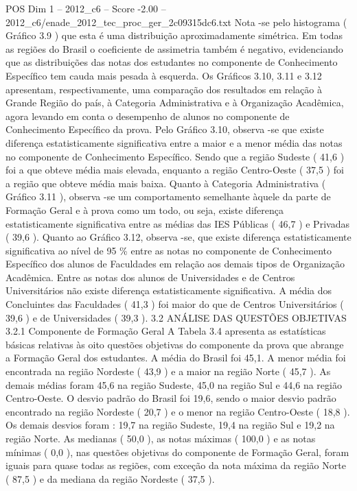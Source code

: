 \begin{textsample}{POS Dim 1 – 2012\_c6 – Score -2.00 – 2012\_c6/enade\_2012\_tec\_proc\_ger\_2c09315dc6.txt}
Nota -se pelo histograma ( Gráfico 3.9 ) que esta é uma distribuição aproximadamente simétrica.
Em todas as regiões do Brasil o coeficiente de assimetria também é negativo, evidenciando que as distribuições das notas dos estudantes no componente de Conhecimento Específico tem cauda mais pesada à esquerda.
Os Gráficos 3.10, 3.11 e 3.12 apresentam, respectivamente, uma comparação dos resultados em relação à Grande Região do país, à Categoria Administrativa e à Organização Acadêmica, agora levando em conta o desempenho de alunos no componente de Conhecimento Específico da prova.
Pelo Gráfico 3.10, observa -se que existe diferença estatisticamente significativa entre a maior e a menor média das notas no componente de Conhecimento Específico.
Sendo que a região Sudeste ( 41,6 ) foi a que obteve média mais elevada, enquanto a região Centro-Oeste ( 37,5 ) foi a região que obteve média mais baixa.
Quanto à Categoria Administrativa ( Gráfico 3.11 ), observa -se um comportamento semelhante àquele da parte de Formação Geral e à prova como um todo, ou seja, existe diferença estatisticamente significativa entre as médias das IES Públicas ( 46,7 ) e Privadas ( 39,6 ).
Quanto ao Gráfico 3.12, observa -se, que existe diferença estatisticamente significativa ao nível de 95 \% entre as notas no componente de Conhecimento Específico dos alunos de Faculdades em relação aos demais tipos de Organização Acadêmica.
Entre as notas dos alunos de Universidades e de Centros Universitários não existe diferença estatisticamente significativa.
A média dos Concluintes das Faculdades ( 41,3 ) foi maior do que de Centros Universitários ( 39,6 ) e de Universidades ( 39,3 ). 3.2 ANÁLISE DAS QUESTÕES OBJETIVAS 3.2.1 Componente de Formação Geral A Tabela 3.4 apresenta as estatísticas básicas relativas às oito questões objetivas do componente da prova que abrange a Formação Geral dos estudantes.
A média do Brasil foi 45,1.
A menor média foi encontrada na região Nordeste ( 43,9 ) e a maior na região Norte ( 45,7 ).
As demais médias foram 45,6 na região Sudeste, 45,0 na região Sul e 44,6 na região Centro-Oeste.
O desvio padrão do Brasil foi 19,6, sendo o maior desvio padrão encontrado na região Nordeste ( 20,7 ) e o menor na região Centro-Oeste ( 18,8 ).
Os demais desvios foram : 19,7 na região Sudeste, 19,4 na região Sul e 19,2 na região Norte.
As medianas ( 50,0 ), as notas máximas ( 100,0 ) e as notas mínimas ( 0,0 ), nas questões objetivas do componente de Formação Geral, foram iguais para quase todas as regiões, com exceção da nota máxima da região Norte ( 87,5 ) e da mediana da região Nordeste ( 37,5 ).

\end{textsample}
